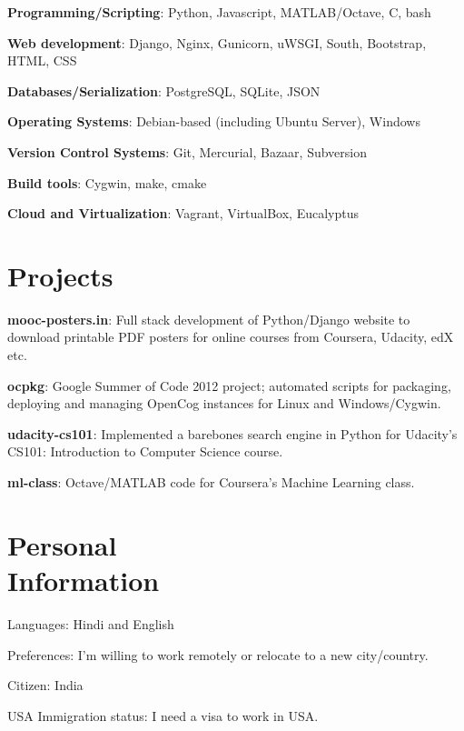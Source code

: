 \documentclass[margin,line]{resume}
\begin{document}
\begin{resume}
    \begin{list2}
	\item \textbf{Programming/Scripting}: \hspace{5mm} Python, Javascript, MATLAB/Octave, C, bash
	\item \textbf{Web development}: \hspace{16mm} Django, Nginx, Gunicorn, uWSGI, South, Bootstrap, HTML, CSS
	\item \textbf{Databases/Serialization}: \hspace{5.7mm} PostgreSQL, SQLite,	JSON
	\item \textbf{Operating Systems}: \hspace{13.8mm} Debian-based (including Ubuntu Server), Windows
	\item \textbf{Version Control Systems}: \hspace{3.8mm} Git, Mercurial, Bazaar, Subversion
	\item \textbf{Build tools}: \hspace{28mm} Cygwin, make, cmake
	\item \textbf{Cloud and Virtualization}: \hspace{3mm} Vagrant, VirtualBox, Eucalyptus
	\end{list2}

    \section{\mysidestyle Projects} 
	\begin{list2}
	\item \textbf{mooc-posters.in}: Full stack development of Python/Django website to download printable PDF posters for online courses from Coursera, Udacity, edX etc.
	\item \textbf{ocpkg}: Google Summer of Code 2012 project; automated scripts for packaging, deploying and managing OpenCog instances for Linux and Windows/Cygwin.
	\item \textbf{udacity-cs101}: Implemented a barebones search engine in Python for Udacity's CS101: Introduction to Computer Science course.
	\item \textbf{ml-class}: Octave/MATLAB code for Coursera's Machine Learning class.
    \end{list2}

    \section{\mysidestyle Personal \\ Information}
    \begin{list2}
    \item Languages: Hindi and English
    \item Preferences: I'm willing to work remotely or relocate to a new city/country.
    \item Citizen: India
    \item USA Immigration status: I need a visa to work in USA.
    \end{list2}


\end{resume}
\end{document}
